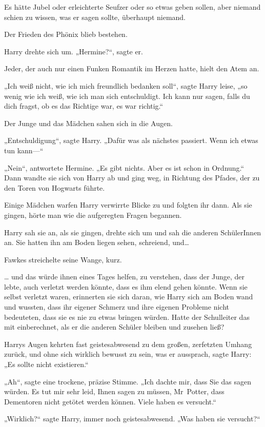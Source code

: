 {Es hätte Jubel oder erleichterte Seufzer oder so etwas geben sollen, aber niemand schien zu wissen, was er sagen sollte, überhaupt niemand.

Der Frieden des Phönix blieb bestehen.

Harry drehte sich um. „Hermine?“, sagte er.

Jeder, der auch nur einen Funken Romantik im Herzen hatte, hielt den Atem an.

„Ich weiß nicht, wie ich mich freundlich bedanken soll“, sagte Harry leise, „so wenig wie ich weiß, wie ich man sich entschuldigt. Ich kann nur sagen, falls du dich fragst, ob es das Richtige war, es war richtig.“

Der Junge und das Mädchen sahen sich in die Augen.

„Entschuldigung“, sagte Harry. „Dafür was als nächstes passiert. Wenn ich etwas tun kann—“

„Nein“, antwortete Hermine. „Es gibt nichts. Aber es ist schon in Ordnung.“ Dann wandte sie sich von Harry ab und ging weg, in Richtung des Pfades, der zu den Toren von Hogwarts führte.

Einige Mädchen warfen Harry verwirrte Blicke zu und folgten ihr dann. Als sie gingen, hörte man wie die aufgeregten Fragen begannen.

Harry sah sie an, als sie gingen, drehte sich um und sah die anderen SchülerInnen an. Sie hatten ihn am Boden liegen sehen, schreiend, und…

Fawkes streichelte seine Wange, kurz.

… und das würde ihnen eines Tages helfen, zu verstehen, dass der Junge, der lebte, auch verletzt werden könnte, dass es ihm elend gehen könnte. Wenn sie selbst verletzt waren, erinnerten sie sich daran, wie Harry sich am Boden wand und wussten, dass ihr eigener Schmerz und ihre eigenen Probleme nicht bedeuteten, dass sie es nie zu etwas bringen würden. Hatte der Schulleiter das mit einberechnet, als er die anderen Schüler bleiben und zusehen ließ?

Harrys Augen kehrten fast geistesabwesend zu dem großen, zerfetzten Umhang zurück, und ohne sich wirklich bewusst zu sein, was er aussprach, sagte Harry: „Es sollte nicht existieren.“

„Ah“, sagte eine trockene, präzise Stimme. „Ich dachte mir, dass Sie das sagen würden. Es tut mir sehr leid, Ihnen sagen zu müssen, Mr~Potter, dass Dementoren nicht getötet werden können. Viele haben es versucht.“

„Wirklich?“ sagte Harry, immer noch geistesabwesend. „Was haben sie versucht?“

}
